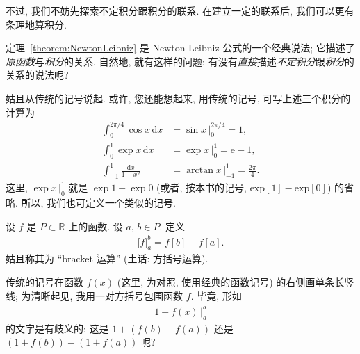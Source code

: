 不过, 我们不妨先探索不定积分跟积分的联系. 在建立一定的联系后, 我们可以更有条理地算积分.

定理~\ref{theorem:NewtonLeibniz} 是 Newton-Leibniz 公式的一个经典说法; 它描述了\emph{原函数}与\emph{积分}的关系. 自然地, 就有这样的问题: 有没有\emph{直接}描述\emph{不定积分}跟\emph{积分}的关系的说法呢?

姑且从传统的记号说起. 或许, 您还能想起来, 用传统的记号, 可写上述三个积分的计算为
\begin{align*}
    \int_{0}^{2\pi/4} {\cos {x}\,\mathrm{d}x}   & = {\sin {x}} \,\Bigg|_{0}^{2\pi/4} = 1,             \\
    \int_{0}^{1} {\exp {x}\,\mathrm{d}x}        & = {\exp {x}} \,\Bigg|_{0}^{1} = \mathrm{e} - 1,     \\
    \int_{-1}^{1} {\frac{\mathrm{d}x}{1 + x^2}} & = {\arctan {x}} \,\Bigg|_{-1}^{1} = \frac{2\pi}{4}.
\end{align*}
这里, ${\exp {x}}\, \bigg|_{0}^{1}$ 就是 $\exp {1} - \exp {0}$ (或者, 按本书的记号, $\mathrm{exp}[1] - \mathrm{exp}[0]$) 的省略. 所以, 我们也可定义一个类似的记号.

\begin{definition}
    设 $f$ 是 $P \subset \mathbb{R}$ 上的函数. 设 $a$, $b \in P$. 定义
    \begin{align*}
        \big[ f \big]_{a}^{b} = f[b] - f[a].
    \end{align*}
    姑且称其为 ``bracket 运算'' (土话: 方括号运算).
\end{definition}

传统的记号在函数 $f(x)$ (这里, 为对照, 使用经典的函数记号) 的右侧画单条长竖线; 为清晰起见, 我用一对方括号包围函数 $f$. 毕竟, 形如
\begin{align*}
    1 + f(x)\,\Bigg|_{a}^{b}
\end{align*}
的文字是有歧义的: 这是 $1 + (f(b) - f(a))$ 还是 $(1 + f(b)) - (1 + f(a))$ 呢?

